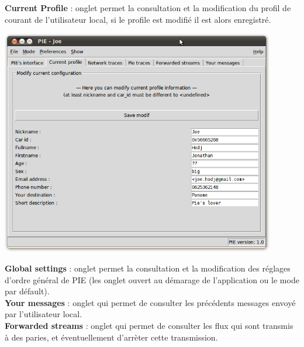 \clearpage
\textbf{Current Profile} : onglet permet la consultation et la modification du profil de
courant de l'utilisateur local, si le profile est modifié il est alors enregistré. \\

\begin{center}
    \includegraphics[width=0.9\textwidth]{img/profile.png}
\end{center}

\textbf{Global settings} : onglet permet la consultation et la modification des réglages 
d'ordre général de PIE (les onglet ouvert au démarage de l'application ou le mode par défault). \\

\textbf{Your messages} : onglet qui permet de consulter les précédents messages envoyé par l'utilisateur local. \\

\textbf{Forwarded streams} : onglet qui permet de consulter les flux qui sont transmis à des paries, et éventuellement d'arrèter cette transmission.\\

